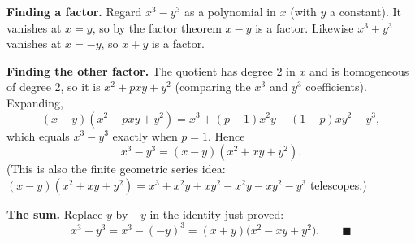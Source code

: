 \textbf{Finding a factor.} Regard $x^3-y^3$ as a polynomial in $x$ (with $y$ a constant). It vanishes at $x=y$, so by the factor theorem $x-y$ is a factor. Likewise $x^3+y^3$ vanishes at $x=-y$, so $x+y$ is a factor.

\textbf{Finding the other factor.} The quotient has degree $2$ in $x$ and is homogeneous of degree $2$, so it is $x^2+pxy+y^2$ (comparing the $x^3$ and $y^3$ coefficients). Expanding,
\[
(x-y)(x^2+pxy+y^2)=x^3+(p-1)x^2y+(1-p)xy^2-y^3 ,
\]
which equals $x^3-y^3$ exactly when $p=1$. Hence
\[
x^3-y^3=(x-y)(x^2+xy+y^2).
\]
(This is also the finite geometric series idea: $(x-y)(x^2+xy+y^2)=x^3+x^2y+xy^2-x^2y-xy^2-y^3$ telescopes.)

\textbf{The sum.} Replace $y$ by $-y$ in the identity just proved:
\[
x^3+y^3=x^3-(-y)^3=(x+y)\bigl(x^2-xy+y^2\bigr). \qquad\blacksquare
\]
